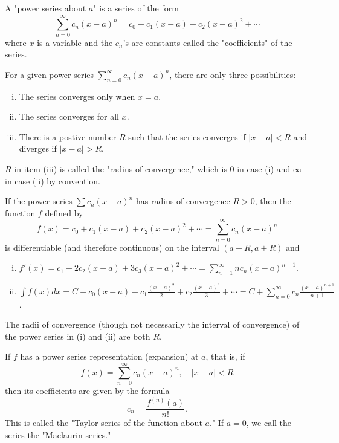 \documentclass[a4paper,8pt]{article}
\begin{document}
\begin{outline}
    A "power series about \(a\)" is a series of the form \[ \sum_{n=0}^{\infty} c_n(x-a)^n = c_0 + c_1(x-a) + c_2(x-a)^2 + \cdots \]
    where \(x\) is a variable and the \(c_n\)'s are constants called the "coefficients" of the series.

    For a given power series \(\sum_{n=0}^{\infty} c_n(x-a)^n\), there are only three possibilities:
    \begin{enumerate}[i.]
      \item The series converges only when \(x = a\).
      \item The series converges for all \(x\).
      \item There is a postive number \(R\) such that the series converges if \(|x-a| < R\) and diverges if \(|x-a| > R\).
    \end{enumerate}
    \(R\) in item (iii) is called the "radius of convergence," which is \(0\) in case (i) and \(\infty\) in case (ii) by convention.

    If the power series \(\sum c_n(x-a)^n\) has radius of convergence \(R > 0\), then the function \(f\) defined by
    \[ f(x) = c_0 + c_1(x-a) + c_2(x-a)^2 + \cdots = \sum_{n=0}^{\infty} c_n(x-a)^n \] is differentiable (and therefore continuous)
    on the interval \((a-R, a+R)\) and
    \begin{enumerate}[i.]
      \item \(f'(x) = c_1 + 2c_2(x-a) + 3c_3(x-a)^2 + \cdots = \sum_{n=1}^{\infty} nc_n(x-a)^{n-1}\).
      \item \(\int f(x)dx = C + c_0(x-a) + c_1\frac{(x-a)^2}{2} + c_2\frac{(x-a)^3}{3} + \cdots = C + \sum_{n=0}^{\infty}c_n\frac{(x-a)^{n+1}}{n+1}\).
    \end{enumerate}
    The radii of convergence (though not necessarily the interval of convergence) of the power series in (i) and (ii) are both \(R\).

    If \(f\) has a power series representation (expansion) at \(a\), that is, if
    \[ f(x) = \sum_{n=0}^{\infty} c_n(x-a)^n,\quad |x-a| < R \]
    then its coefficients are given by the formula \[ c_n = \frac{f^{(n)}(a)}{n!}\text{.} \]
    This is called the "Taylor series of the function about \(a\)." If \(a = 0\), we call the series
    the "Maclaurin series."


\end{outline}
\end{document}
